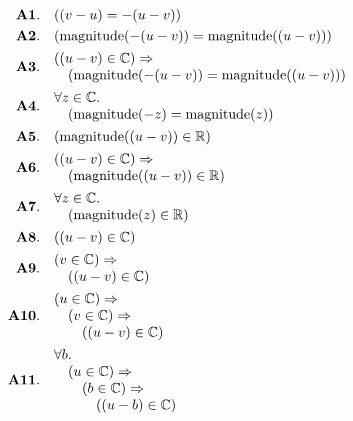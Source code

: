 \documentclass[11pt]{article}
\theoremstyle{plain}
\begin{document}
\begin{align*}
  \mathbf{A1.}\quad & ((v - u) = -(u - v)) \\
  \mathbf{A2.}\quad & (\operatorname{magnitude}(-(u - v)) = \operatorname{magnitude}((u - v))) \\
  \mathbf{A3.}\quad & \begin{array}{@{}l@{}} ((u - v) \in \mathbb{C}) \Rightarrow  \\ \quad (\operatorname{magnitude}(-(u - v)) = \operatorname{magnitude}((u - v))) \end{array} \\
  \mathbf{A4.}\quad & \begin{array}{@{}l@{}} \forall z \in \mathbb{C}. \\ \quad (\operatorname{magnitude}(-z) = \operatorname{magnitude}(z)) \end{array} \\
  \mathbf{A5.}\quad & (\operatorname{magnitude}((u - v)) \in \mathbb{R}) \\
  \mathbf{A6.}\quad & \begin{array}{@{}l@{}} ((u - v) \in \mathbb{C}) \Rightarrow  \\ \quad (\operatorname{magnitude}((u - v)) \in \mathbb{R}) \end{array} \\
  \mathbf{A7.}\quad & \begin{array}{@{}l@{}} \forall z \in \mathbb{C}. \\ \quad (\operatorname{magnitude}(z) \in \mathbb{R}) \end{array} \\
  \mathbf{A8.}\quad & ((u - v) \in \mathbb{C}) \\
  \mathbf{A9.}\quad & \begin{array}{@{}l@{}} (v \in \mathbb{C}) \Rightarrow  \\ \quad ((u - v) \in \mathbb{C}) \end{array} \\
  \mathbf{A10.}\quad & \begin{array}{@{}l@{}} (u \in \mathbb{C}) \Rightarrow  \\ \quad (v \in \mathbb{C}) \Rightarrow  \\ \quad \quad ((u - v) \in \mathbb{C}) \end{array} \\
  \mathbf{A11.}\quad & \begin{array}{@{}l@{}} \forall b. \\ \quad (u \in \mathbb{C}) \Rightarrow  \\ \quad \quad (b \in \mathbb{C}) \Rightarrow  \\ \quad \quad \quad ((u - b) \in \mathbb{C}) \end{array} \\

\end{align*}
\end{document}
